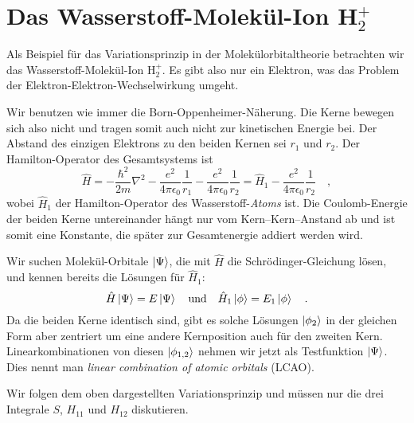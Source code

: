 \section{Das Wasserstoff-Molekül-Ion H$_2^+$}

Als Beispiel für das Variationsprinzip in der Molekülorbitaltheorie betrachten wir das Wasserstoff-Molekül-Ion H$_2^+$. Es gibt also nur ein Elektron, was das Problem der Elektron-Elektron-Wechselwirkung umgeht.

Wir benutzen wie immer die Born-Oppenheimer-Näherung. Die Kerne bewegen sich also nicht und tragen somit auch nicht zur kinetischen Energie bei. Der Abstand des einzigen Elektrons zu den beiden Kernen sei $r_1$ und $r_2$. Der Hamilton-Operator des Gesamtsystems ist
\begin{equation}
\hat{H} =  - \frac{\hbar^2}{2 m} \nabla^2 - \frac{e^2}{4 \pi \epsilon_0} \frac{1}{r_{1}} - \frac{e^2}{4 \pi \epsilon_0} \frac{1}{r_{2}}
= \hat{H}_1  - \frac{e^2}{4 \pi \epsilon_0} \frac{1}{r_{2}} \quad ,
\end{equation} 
wobei $\hat{H}_1 $ der Hamilton-Operator des Wasserstoff-\emph{Atoms} ist. Die Coulomb-Energie der beiden Kerne untereinander hängt nur vom Kern--Kern--Anstand ab und ist somit eine Konstante, die später zur Gesamtenergie addiert werden wird.

Wir suchen Molekül-Orbitale $\ket{\Psi}$, die mit $\hat{H}$ die Schrödinger-Gleichung lösen, und kennen bereits die Lösungen für $\hat{H}_1$:
\begin{equation}
\hat{H} \ket{\Psi} = E \ket{\Psi} \quad \text{und} \quad 
\hat{H}_1 \ket{\phi} = E_1 \ket{\phi}  \quad .
\end{equation}
Da die beiden Kerne identisch sind, gibt es solche Lösungen $\ket{\phi_2}$ in der gleichen Form aber zentriert um eine andere Kernposition auch für den zweiten Kern. Linearkombinationen von diesen  $\ket{\phi_{1,2}}$ nehmen wir jetzt als Testfunktion $\ket{\Psi}$. Dies nennt man \emph{linear combination of atomic orbitals} (LCAO).

Wir folgen dem oben dargestellten Variationsprinzip und müssen nur die drei Integrale $S$, $ H_{11}$ und $H_{12}$ diskutieren.

